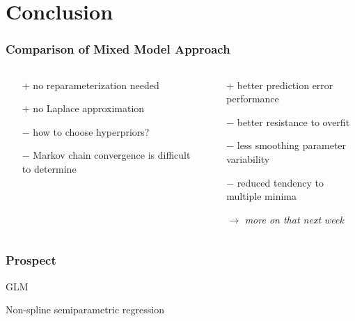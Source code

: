 \documentclass[final]{beamer}
\begin{document}
\section{Conclusion}


\begin{frame}
\frametitle{Comparison of Mixed Model Approach}
\begin{columns}[T]
\begin{column}{0.5\textwidth}
\centering{\textcolor{beamer@postercolour}{Fully Bayesian approach \\(MCMC)}}
\begin{itemize}
\item[$+$] no reparameterization needed
\item[$+$] no Laplace approximation
\item[$-$] how to choose hyperpriors?
\item[$-$] Markov chain convergence is difficult to determine
\end{itemize}
\end{column}
\begin{column}{0.5\textwidth}
\centering{\textcolor{beamer@postercolour}{Prediction error methods \\ (AIC, GCV)}}
\begin{itemize}
\item[$+$] better prediction error performance 
\item[$-$] better resistance to overfit
\item[$-$] less smoothing parameter variability
\item[$-$] reduced tendency to multiple minima
\item[$\rightarrow$] \textit{more on that next week}
\end{itemize}
\end{column}
\end{columns}
\end{frame}


\begin{frame}
\frametitle{Prospect}

GLM

Non-spline semiparametric regression

\end{frame}
\end{document}
